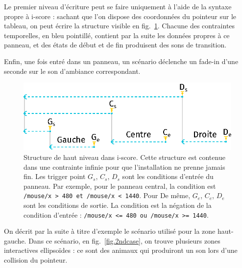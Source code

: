 \documentclass[french]{article}
\begin{document}
    
    Le premier niveau d'écriture peut se faire uniquement à l'aide de la syntaxe propre à i-score : 
    sachant que l'on dispose des coordonnées du pointeur sur le tableau, on peut écrire la structure visible en fig.~\ref{fig.1stlevel}.
    Chacune des contraintes temporelles, en bleu pointillé, contient par la suite les données propres à ce panneau, et des états de début et de fin produisent des sons de transition.
    
    Enfin, une fois entré dans un panneau, un scénario déclenche un fade-in d'une seconde sur le son d'ambiance correspondant.
    
    \begin{figure}[h]
        \centering
        \includegraphics{images/1stcase.eps}
        \caption{Structure de haut niveau dans i-score. Cette structure est contenue dans une contrainte infinie pour que l'installation ne prenne jamais fin. Les trigger point $G_s$, $C_s$, $D_s$ sont les conditions d'entrée du panneau. Par exemple, pour le panneau central, la condition est \lstinline{/mouse/x > 480 et /mouse/x < 1440}. Pour De même, $G_e$, $C_e$, $D_e$ sont les conditions de sortie. La condition est la négation de la condition d'entrée : \lstinline{/mouse/x <= 480 ou /mouse/x >= 1440}.}
        \label{fig.1stlevel}
    \end{figure}
    
    On décrit par la suite à titre d'exemple le scénario utilisé pour la zone haut-gauche.
    Dans ce scénario, en fig.~\ref{fig.2ndcase}, on trouve plusieurs zones interactives ellipsoïdes : ce sont des animaux qui produiront un son lors d'une collision du pointeur.
    
\end{document}

